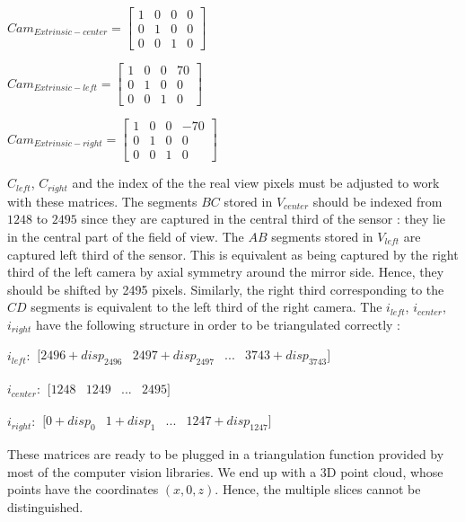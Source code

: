 \documentclass[a4paper,twocolumn,fleqn]{article}
\begin{document}
\begin{center}
$Cam_{Extrinsic-center} =
\begin{bmatrix}
1 & 0 & 0 & 0\\
0 & 1 & 0 & 0\\
0 & 0 & 1 & 0
\end{bmatrix}$

$Cam_{Extrinsic-left} =
\begin{bmatrix}
1 & 0 & 0 & 70\\
0 & 1 & 0 & 0\\
0 & 0 & 1 & 0
\end{bmatrix}$

$Cam_{Extrinsic-right} =
\begin{bmatrix}
1 & 0 & 0 & -70\\
0 & 1 & 0 & 0\\
0 & 0 & 1 & 0
\end{bmatrix}$
\end{center}

$C_{left}$, $C_{right}$ and the index of the the real view pixels must be adjusted to work with these matrices. The segments $BC$ stored in $V_{center}$ should be indexed from $1248$ to $2495$ since they are captured in the central third of the sensor : they lie in the central part of the field of view. The $AB$ segments stored in $V_{left}$ are captured left third of the sensor. This is equivalent as being captured by the right third of the left camera by axial symmetry around the mirror side. Hence, they should be shifted by 2495 pixels. Similarly, the right third corresponding to the $CD$ segments is equivalent to the left third of the right camera. The $i_{left}$, $i_{center}$, $i_{right}$ have the following structure in order to be triangulated correctly :

\begin{center}
$i_{left} :
\begin{smallmatrix}
[2496+disp_{2496} & 2497+disp_{2497} & ... & 3743+disp_{3743}]
\end{smallmatrix}$

$i_{center} :
\begin{smallmatrix}
[1248 & 1249 & ... & 2495]
\end{smallmatrix}$

$i_{right} :
\begin{smallmatrix}
[0+disp_0 & 1+disp_1 & ... & 1247+disp_{1247}]
\end{smallmatrix}$
\end{center}

These matrices are ready to be plugged in a triangulation function provided by most of the computer vision libraries. We end up with a 3D point cloud, whose points have the coordinates $(x, 0, z)$. Hence, the multiple slices cannot be distinguished.
\end{document}
